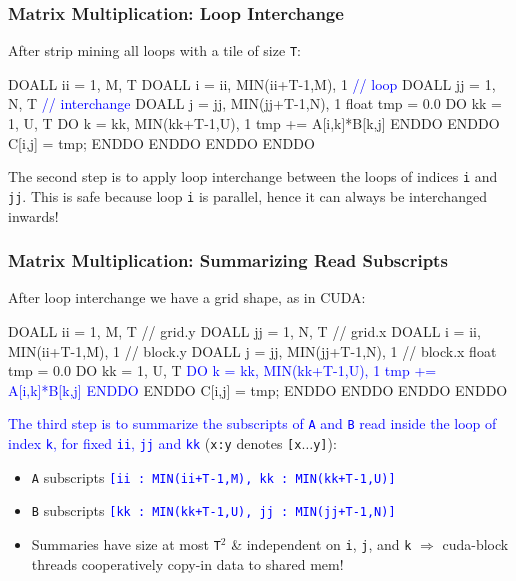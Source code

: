 \documentclass{beamer}
\newcommand{\blue}[1]{\textcolor{Blue}{{#1}}}
\renewcommand{\emph}[1]{\textcolor{structure}{#1}}
\newcommand{\emp}[1]{\textcolor{DikuRed}{ #1}}
\begin{document}
\begin{frame}[fragile,t]
  \frametitle{Matrix Multiplication: Loop Interchange} %

After strip mining all loops with a tile of size {\tt T}:
\begin{colorcode}[fontsize=\scriptsize]
\emp{DOALL ii = 1, M, T}
  \emph{DOALL i = ii, MIN(ii+T-1,M), 1}     \blue{// loop}
    \emp{DOALL jj = 1, N, T}               \blue{// interchange}
      \emph{DOALL j = jj, MIN(jj+T-1,N), 1}
        float tmp = 0.0
        DO kk = 1, U, T
          DO k = kk, MIN(kk+T-1,U), 1
            tmp += A[i,k]*B[k,j]
        ENDDO ENDDO
        C[i,j] = tmp;
ENDDO ENDDO ENDDO ENDDO
\end{colorcode}
\medskip

The second step is to apply loop interchange between the loops 
of indices {\tt i} and {\tt jj}. This is safe because loop {\tt i}
is parallel, hence it can always be interchanged inwards!

\end{frame}

\begin{frame}[fragile,t]
  \frametitle{Matrix Multiplication: Summarizing Read Subscripts} %

After loop interchange we have a grid shape, as in CUDA:
\begin{colorcode}[fontsize=\scriptsize]
\emp{DOALL ii = 1, M, T}                    // \emp{grid.y}
  \emp{DOALL jj = 1, N, T}                  // \emp{grid.x}
    \emph{DOALL i = ii, MIN(ii+T-1,M), 1}    // \emph{block.y}
      \emph{DOALL j = jj, MIN(jj+T-1,N), 1}  // \emph{block.x}
        float tmp = 0.0
        DO kk = 1, U, T
          \blue{DO k = kk, MIN(kk+T-1,U), 1}
            \blue{tmp += A[i,k]*B[k,j]}
          \blue{ENDDO} 
        ENDDO
        C[i,j] = tmp;
ENDDO ENDDO ENDDO ENDDO
\end{colorcode}
\medskip

\blue{The third step is to summarize the subscripts of {\tt A} and {\tt B}
read inside the loop of index {\tt k}, for fixed {\tt ii}, {\tt jj} and {\tt kk}}
({\tt x:y} denotes {\tt [x$\ldots$y]}):
\begin{itemize}
    \item {\tt A} subscripts \blue{\tt[ii~:~MIN(ii+T-1,M), kk~:~MIN(kk+T-1,U)]}
    \item {\tt B} subscripts \blue{\tt[kk~:~MIN(kk+T-1,U), jj~:~MIN(jj+T-1,N)]}
    \item Summaries have size at most {\tt T$^2$} \& independent on {\tt i}, 
            {\tt j}, and {\tt k} $\Rightarrow$ {\sc cuda}-block threads 
            cooperatively copy-in data to shared mem!   
\end  {itemize}

\end{frame}
\end{document}
